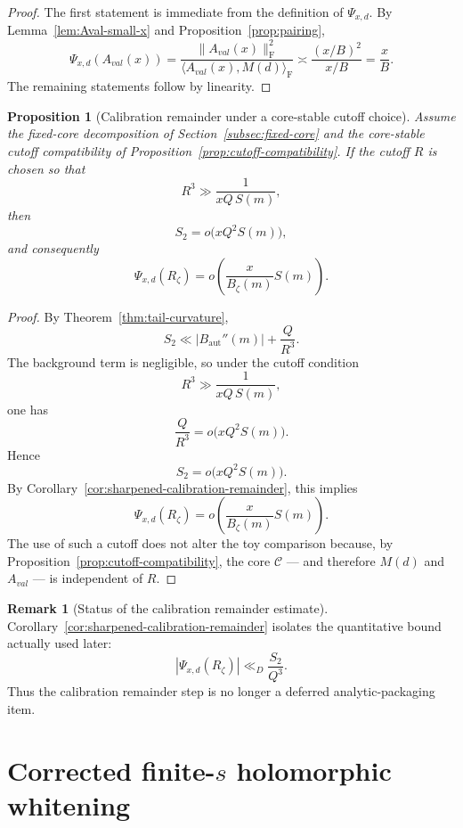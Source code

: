 \documentclass[11pt,a4paper]{amsart}
\def\val{val}%
\theoremstyle{plain}
\newtheorem{proposition}[theorem]{Proposition}
\theoremstyle{definition}
\newtheorem{remark}[theorem]{Remark}
\newcommand{\Aut}{\mathrm{aut}}
\newcommand{\val}{\mathrm{val}}
\newcommand{\F}{\mathrm{F}}
\begin{document}
\begin{proof}
The first statement is immediate from the definition of $\Psi_{x,d}$.
By Lemma~\ref{lem:Aval-small-x} and Proposition~\ref{prop:pairing},
\[
\Psi_{x,d}(A_{\val}(x))
=
\frac{\|A_{\val}(x)\|_\F^2}{\langle A_{\val}(x),M(d)\rangle_\F}
\asymp
\frac{(x/B)^2}{x/B}
=
\frac{x}{B}.
\]
The remaining statements follow by linearity.
\end{proof}

\begin{proposition}[Calibration remainder under a core-stable cutoff choice]
\label{prop:calibration-remainder-cutoff}
Assume the fixed-core decomposition of
Section~\ref{subsec:fixed-core} and the core-stable cutoff compatibility of
Proposition~\ref{prop:cutoff-compatibility}. If the cutoff $R$ is chosen so
that
\[
R^3\gg \frac{1}{xQ\,S(m)},
\]
then
\[
S_2=o\!\bigl(xQ^2S(m)\bigr),
\]
and consequently
\[
\Psi_{x,d}(R_\zeta)=o\!\left(\frac{x}{B_\zeta(m)}S(m)\right).
\]
\end{proposition}

\begin{proof}
By Theorem~\ref{thm:tail-curvature},
\[
S_2\ll |B_{\Aut}''(m)|+\frac{Q}{R^3}.
\]
The background term is negligible, so under the cutoff condition
\[
R^3\gg \frac{1}{xQ\,S(m)},
\]
one has
\[
\frac{Q}{R^3}=o\!\bigl(xQ^2S(m)\bigr).
\]
Hence
\[
S_2=o\!\bigl(xQ^2S(m)\bigr).
\]
By Corollary~\ref{cor:sharpened-calibration-remainder}, this implies
\[
\Psi_{x,d}(R_\zeta)=o\!\left(\frac{x}{B_\zeta(m)}S(m)\right).
\]
The use of such a cutoff does not alter the toy comparison because, by
Proposition~\ref{prop:cutoff-compatibility}, the core $\mathcal C$ --- and
therefore $M(d)$ and $A_{\val}$ --- is independent of $R$.
\end{proof}

\begin{remark}[Status of the calibration remainder estimate]
\label{rem:status-sharpened-calibration-remainder}
Corollary~\ref{cor:sharpened-calibration-remainder} isolates the quantitative
bound actually used later:
\[
|\Psi_{x,d}(R_\zeta)|\ll_D \frac{S_2}{Q^3}.
\]
Thus the calibration remainder step is no longer a deferred analytic-packaging
item.
\end{remark}

\section{Corrected finite-\texorpdfstring{$s$}{s} holomorphic whitening}
\end{document}
